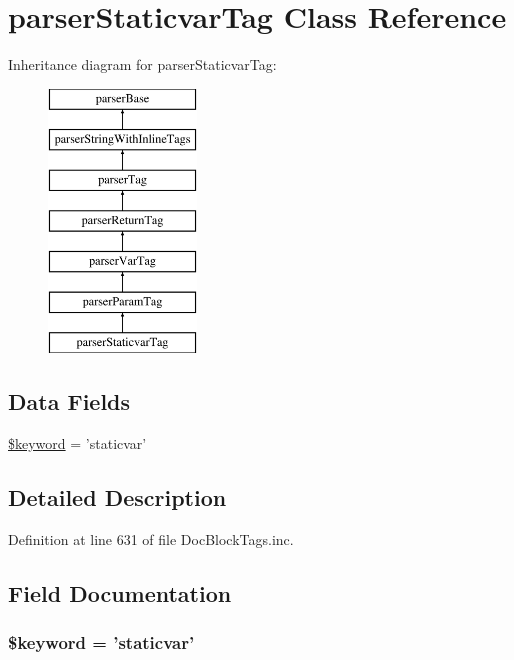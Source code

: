 \hypertarget{classparser_staticvar_tag}{\section{parser\-Staticvar\-Tag \-Class \-Reference}
\label{classparser_staticvar_tag}
}
\-Inheritance diagram for parser\-Staticvar\-Tag\-:\begin{figure}[H]
\begin{center}
\leavevmode
\includegraphics[height=7.000000cm]{classparser_staticvar_tag}
\end{center}
\end{figure}
\subsection*{\-Data \-Fields}
\begin{DoxyCompactItemize}
\item 
\hyperlink{classparser_staticvar_tag_a4a925d6b38bcf3957c713a7d3dc7da1f}{\$keyword} = 'staticvar'
\end{DoxyCompactItemize}


\subsection{\-Detailed \-Description}


\-Definition at line 631 of file \-Doc\-Block\-Tags.\-inc.



\subsection{\-Field \-Documentation}
\hypertarget{classparser_staticvar_tag_a4a925d6b38bcf3957c713a7d3dc7da1f}{
\subsubsection[{\$keyword}]{\setlength{\rightskip}{0pt plus 5cm}\$keyword = 'staticvar'}}\label{classparser_staticvar_tag_a4a925d6b38bcf3957c713a7d3dc7da1f}


